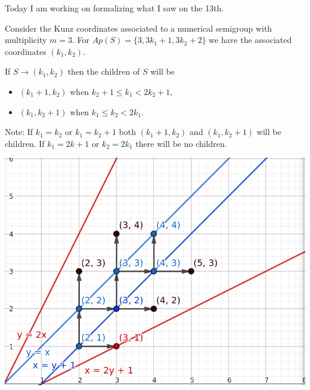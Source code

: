 Today I am working on formalizing what I saw on the 13th. 

Consider the Kunz coordinates associated to a numerical semigroup with multiplicity $m=3$. For $Ap(S) = \{ 3, 3k_1+1, 3k_2+2\}$ we have the associated coordinates $(k_1, k_2).$

If $S \to (k_1, k_2)$ then the children of $S$ will be 
\begin{itemize}
    \item $(k_1 + 1, k_2)$ when $k_2 + 1 \leq k_1 < 2k_2 + 1$,
    \item $(k_1, k_2 + 1)$ when $k_1 \leq k_2 < 2k_1$.
\end{itemize}
Note: If $k_1=k_2$ or $k_1 = k_2 + 1$ both $(k_1 + 1, k_2)$ and $(k_1, k_2 + 1)$ will be children. If $k_1 = 2k+1$ or $k_2 = 2k_1$ there will be no children.

\includegraphics[scale=0.3]{Max/images/Screenshot from 2024-07-15 13-01-52.png}